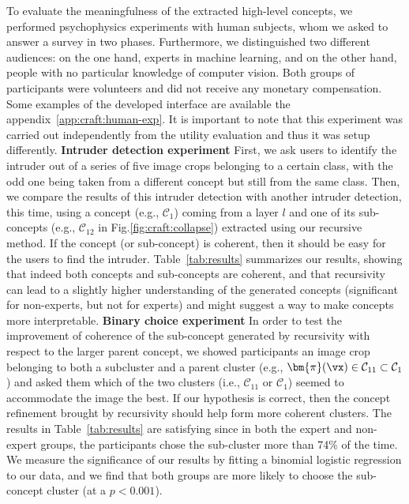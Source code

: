 To evaluate the meaningfulness of the extracted high-level concepts, we performed psychophysics experiments with human subjects, whom we asked to answer a survey in two phases. Furthermore, we distinguished two different audiences: on the one hand, experts in machine learning, and on the other hand, people with no particular knowledge of computer vision. Both groups of participants were volunteers and did not receive any monetary compensation. Some examples of the developed interface are available the appendix~\ref{app:craft:human-exp}. It is important to note that this experiment was carried out independently from the utility evaluation and thus it was setup differently.
\newline\textbf{Intruder detection experiment} First, we ask users to identify the intruder out of a series of five image crops belonging to a certain class, with the odd one being taken from a different concept but still from the same class. Then, we compare the results of this intruder detection with another intruder detection, this time, using a concept (e.g., $\mathcal{C}_1$) coming from a layer $l$ and one of its sub-concepts (e.g., $\mathcal{C}_{12}$ in Fig.\ref{fig:craft:collapse}) extracted using our recursive method. If the concept (or sub-concept) is coherent, then it should be easy for the users to find the intruder.
Table~\ref{tab:results} summarizes our results, showing that indeed both concepts and sub-concepts are coherent, and that recursivity can lead to a slightly higher understanding of the generated concepts (significant for non-experts, but not for experts) and might suggest a way to make concepts more interpretable.
\newline\textbf{Binary choice experiment} In order to test the improvement of coherence of the sub-concept generated by recursivity with respect to the larger parent concept, we showed participants an image crop belonging to both a subcluster and a parent cluster (e.g.,  $\bm{\pi}(\vx) \in \mathcal{C}_{11} \subset \mathcal{C}_1$) and asked them which of the two clusters (i.e., $\mathcal{C}_{11}$ or $\mathcal{C}_{1}$) seemed to accommodate the image the best. If our hypothesis is correct, then the concept refinement brought by recursivity should help form more coherent clusters.
The results in Table~\ref{tab:results} are satisfying since in both the expert and non-expert groups, the participants chose the sub-cluster more than 74\% of the time. We measure the significance of our results by fitting a binomial logistic regression to our data, and we find that both groups are more likely to choose the sub-concept cluster (at a $p < 0.001$).

